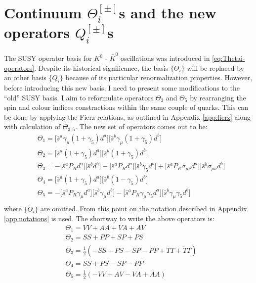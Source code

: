 \documentclass[english, LaM, oneside, noexaminfo]{sapthesis}
\newcommand{\kkb}{$K^0$ - $\bar K^0$ }
\begin{document}
\section{Continuum $\Theta_i^{[\pm]}$s and the new operators $Q_i^{[\pm]}$s}
\noindent
The SUSY operator basis for \kkb oscillations was introduced in \ref{eq:Thetai-operators}.
Despite its historical significance, the basis $\{\Theta_i\}$ will be replaced by an other basis $\{Q_i\}$ because of its particular renormalization properties.
However, before introducing this new basis, I need to present some modifications to the ``old'' SUSY basis.
\newline
I aim to reformulate operators $\Theta_3$ and $\Theta_5$ by rearranging the spin and colour indices constractions within the same couple of quarks. 
This can be done by applying the Fierz relations\cite{Itzykson-Zuber}, as outlined in Appendix \ref{app:fierz} along with calculation of $\Theta_{3,5}$.
The new set of operators comes out to be:
\begin{equation*}
    \begin{aligned}
        & \Theta_1 = \Big[\bar s^a \gamma_\mu (1+\gamma_5) d^a \Big]\Big[ \bar s^b \gamma_\mu (1+\gamma_5) d^b \Big] \\
        & \Theta_2 = \Big[\bar s^a  (1+\gamma_5) d^a \Big]\Big[ \bar s^b (1+\gamma_5) d^b \Big] \\
        & \Theta_3 = -\Big[\bar s^a  P_R d^a \Big]\Big[ \bar s^b d^b \Big] - \Big[\bar s^a P_R d^a \Big]\Big[ \bar s^b \gamma_5 d^b \Big] + \Big[\bar s^a P_R \sigma_{\mu\nu} d^a \Big]\Big[ \bar s^b \sigma_{\mu\nu} d^b \Big] \\ 
        & \Theta_4 = \Big[\bar s^a  (1+\gamma_5) d^a \Big]\Big[ \bar s^b (1-\gamma_5) d^b \Big] \\
        & \Theta_5 = -\Big[\bar s^a  P_R\gamma_\mu d^a \Big]\Big[ \bar s^b \gamma_\mu d^b \Big] - \Big[\bar s^a P_R \gamma_\mu \gamma_5 d^a \Big]\Big[ \bar s^b \gamma_\mu\gamma_5 d^b \Big] \\
     \end{aligned}
\end{equation*}
where $\{\tilde\Theta_i\}$ are omitted.
From this point on the notation described in Appendix \ref{app:notations} is used.
The shortway to write the above operators is:
\begin{equation*}
    \begin{aligned}
        & \Theta_1 = VV + AA +VA +AV \\
        & \Theta_2 = SS + PP + SP + PS \\
        & \Theta_3 = \frac{1}{2}\left( -SS-PS-SP-PP+TT+\tilde{T}T \right) \\
        & \Theta_4 = SS + PS - SP - PP \\
        & \Theta_5 = \frac{1}{2}\left(-VV+AV-VA+AA\right) \\
     \end{aligned}
\end{equation*}
\end{document}
